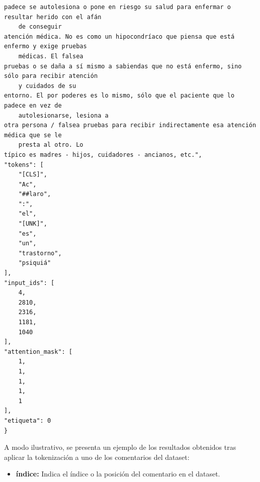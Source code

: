 \vspace{0.5cm}

\begin{lstlisting}[style=jsoncode]
padece se autolesiona o pone en riesgo su salud para enfermar o resultar herido con el afán
    de conseguir
atención médica. No es como un hipocondríaco que piensa que está enfermo y exige pruebas
    médicas. El falsea
pruebas o se daña a sí mismo a sabiendas que no está enfermo, sino sólo para recibir atención
    y cuidados de su
entorno. El por poderes es lo mismo, sólo que el paciente que lo padece en vez de
    autolesionarse, lesiona a
otra persona / falsea pruebas para recibir indirectamente esa atención médica que se le
    presta al otro. Lo
típico es madres - hijos, cuidadores - ancianos, etc.",
"tokens": [
    "[CLS]",
    "Ac",
    "##laro",
    ":",
    "el",
    "[UNK]",
    "es",
    "un",
    "trastorno",
    "psiquiá"
],
"input_ids": [
    4,
    2810,
    2316,
    1181,
    1040
],
"attention_mask": [
    1,
    1,
    1,
    1,
    1
],
"etiqueta": 0
}
\end{lstlisting}

A modo ilustrativo, se presenta un ejemplo de los resultados obtenidos tras aplicar la tokenización a uno de los comentarios del dataset:

\begin{itemize}
    \item \textbf{índice:} Indica el índice o la posición del comentario en el dataset.
\end{itemize}





\vspace{0.5cm}

